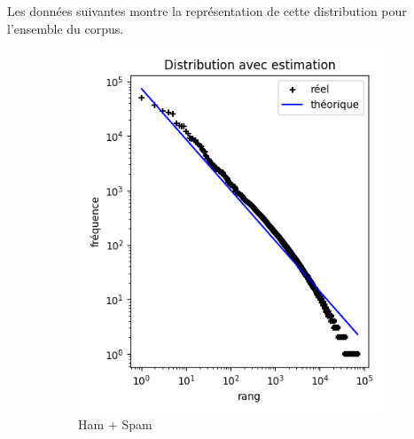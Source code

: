 \documentclass[a4paper,12pt]{article}
\begin{document}
			Les données suivantes montre la représentation de cette distribution pour l'ensemble du corpus.
			\begin{figure}[H]
  				\centering
  				\begin{subfigure}[b]{0.3\linewidth}
    					\includegraphics[width=\linewidth]{img/zipfGlobal.png}
    					\caption{Ham + Spam}
  				\end{subfigure}
  				\begin{subfigure}[b]{0.3\linewidth}

\end{subfigure}
\end{figure}
\end{document}
